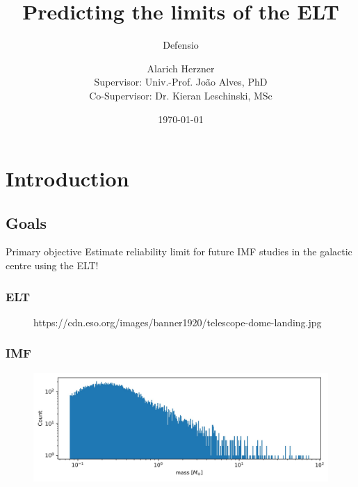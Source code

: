 \documentclass{beamer}
\title{Predicting the limits of the ELT}
\subtitle{Defensio}
\author[Alarich Herzner]{Alarich Herzner\\[1ex]  {\small Supervisor: Univ.-Prof. Jo\~ao Alves, PhD \\ Co-Supervisor: Dr. Kieran Leschinski, MSc}}
\institute{University of Vienna, Faculty of Physics}
\date{\today}
\begin{document}
\begin{frame}
\titlepage
\end{frame}

\section{Introduction}

%


\subsection{Goals}

\begin{frame}
\begin{block}{Primary objective}
Estimate reliability limit for future IMF studies in the galactic centre using the ELT!
\end{block}
\end{frame}

\begin{frame}
\frametitle{ELT}
  \begin{figure}
                  {https://cdn.eso.org/images/banner1920/telescope-dome-landing.jpg}
  \end{figure}
\end{frame}

\begin{frame}
\frametitle{IMF}
  \begin{figure}
  \includegraphics[width=\linewidth]{Images/IMF1.jpg}
  \end{figure}
\end{frame}
\end{document}
